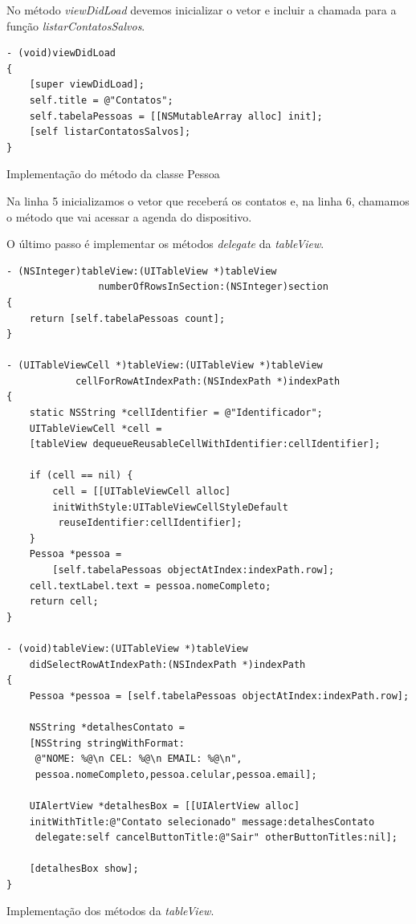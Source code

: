 \documentclass[a4paper,12pt,brazil,oneside]{book}
\begin{document}
No método \emph{viewDidLoad} devemos inicializar o vetor e incluir a chamada para a função \emph{listarContatosSalvos}.

\begin{listing}[H]
\begin{verbatim}
- (void)viewDidLoad
{
    [super viewDidLoad];
    self.title = @"Contatos";
    self.tabelaPessoas = [[NSMutableArray alloc] init];
    [self listarContatosSalvos];   
}
\end{verbatim}
\caption{Implementação do método da classe Pessoa}
\end{listing}

Na linha 5 inicializamos o vetor que receberá os contatos e, na linha 6, chamamos o método que vai acessar a agenda do dispositivo. 

O último passo é implementar os métodos \emph{delegate} da \emph{tableView}.

\begin{listing}[H]
\begin{verbatim}
- (NSInteger)tableView:(UITableView *)tableView 
				numberOfRowsInSection:(NSInteger)section
{
    return [self.tabelaPessoas count];
}

- (UITableViewCell *)tableView:(UITableView *)tableView 
			cellForRowAtIndexPath:(NSIndexPath *)indexPath
{
    static NSString *cellIdentifier = @"Identificador";
    UITableViewCell *cell = 
    [tableView dequeueReusableCellWithIdentifier:cellIdentifier];
    
    if (cell == nil) {
        cell = [[UITableViewCell alloc] 
        initWithStyle:UITableViewCellStyleDefault 
         reuseIdentifier:cellIdentifier];
    }
    Pessoa *pessoa = 
    	[self.tabelaPessoas objectAtIndex:indexPath.row];
    cell.textLabel.text = pessoa.nomeCompleto;
    return cell;
}

- (void)tableView:(UITableView *)tableView 
	didSelectRowAtIndexPath:(NSIndexPath *)indexPath
{
    Pessoa *pessoa = [self.tabelaPessoas objectAtIndex:indexPath.row];
    
    NSString *detalhesContato = 
    [NSString stringWithFormat:
     @"NOME: %@\n CEL: %@\n EMAIL: %@\n",
     pessoa.nomeCompleto,pessoa.celular,pessoa.email];
    
    UIAlertView *detalhesBox = [[UIAlertView alloc] 
    initWithTitle:@"Contato selecionado" message:detalhesContato
     delegate:self cancelButtonTitle:@"Sair" otherButtonTitles:nil];    
     
    [detalhesBox show];   
}
\end{verbatim}
\caption{Implementação dos métodos da \emph{tableView}.}
\end{listing}
\end{document}
